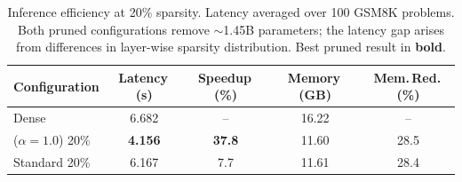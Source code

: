 \begin{table}[t]
\centering
\small
\caption{Inference efficiency at 20\% sparsity. Latency averaged over 100 GSM8K problems. Both pruned configurations remove ${\sim}$1.45B parameters; the latency gap arises from differences in layer-wise sparsity distribution. Best pruned result in \textbf{bold}.}
\label{tab:inference}
\begin{tabular}{@{}lcccc@{}}
\toprule
Configuration & Latency\,(s) & Speedup\,(\%) & Memory\,(GB) & Mem.\,Red.\,(\%) \\
\midrule
Dense & 6.682 & -- & 16.22 & -- \\
\rasp{} ($\alpha{=}1.0$) 20\% & \textbf{4.156} & \textbf{37.8} & 11.60 & 28.5 \\
Standard 20\% & 6.167 & 7.7 & 11.61 & 28.4 \\
\bottomrule
\end{tabular}
\end{table}
